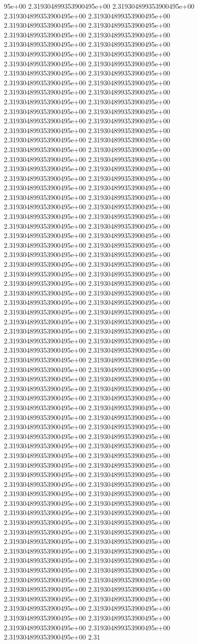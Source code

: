 95e+00	2.319304899353900495e+00	2.319304899353900495e+00	2.319304899353900495e+00	2.319304899353900495e+00	2.319304899353900495e+00	2.319304899353900495e+00	2.319304899353900495e+00	2.319304899353900495e+00	2.319304899353900495e+00	2.319304899353900495e+00	2.319304899353900495e+00	2.319304899353900495e+00	2.319304899353900495e+00	2.319304899353900495e+00	2.319304899353900495e+00	2.319304899353900495e+00	2.319304899353900495e+00	2.319304899353900495e+00	2.319304899353900495e+00	2.319304899353900495e+00	2.319304899353900495e+00	2.319304899353900495e+00	2.319304899353900495e+00	2.319304899353900495e+00	2.319304899353900495e+00	2.319304899353900495e+00	2.319304899353900495e+00	2.319304899353900495e+00	2.319304899353900495e+00	2.319304899353900495e+00	2.319304899353900495e+00	2.319304899353900495e+00	2.319304899353900495e+00	2.319304899353900495e+00	2.319304899353900495e+00	2.319304899353900495e+00	2.319304899353900495e+00	2.319304899353900495e+00	2.319304899353900495e+00	2.319304899353900495e+00	2.319304899353900495e+00	2.319304899353900495e+00	2.319304899353900495e+00	2.319304899353900495e+00	2.319304899353900495e+00	2.319304899353900495e+00	2.319304899353900495e+00	2.319304899353900495e+00	2.319304899353900495e+00	2.319304899353900495e+00	2.319304899353900495e+00	2.319304899353900495e+00	2.319304899353900495e+00	2.319304899353900495e+00	2.319304899353900495e+00	2.319304899353900495e+00	2.319304899353900495e+00	2.319304899353900495e+00	2.319304899353900495e+00	2.319304899353900495e+00	2.319304899353900495e+00	2.319304899353900495e+00	2.319304899353900495e+00	2.319304899353900495e+00	2.319304899353900495e+00	2.319304899353900495e+00	2.319304899353900495e+00	2.319304899353900495e+00	2.319304899353900495e+00	2.319304899353900495e+00	2.319304899353900495e+00	2.319304899353900495e+00	2.319304899353900495e+00	2.319304899353900495e+00	2.319304899353900495e+00	2.319304899353900495e+00	2.319304899353900495e+00	2.319304899353900495e+00	2.319304899353900495e+00	2.319304899353900495e+00	2.319304899353900495e+00	2.319304899353900495e+00	2.319304899353900495e+00	2.319304899353900495e+00	2.319304899353900495e+00	2.319304899353900495e+00	2.319304899353900495e+00	2.319304899353900495e+00	2.319304899353900495e+00	2.319304899353900495e+00	2.319304899353900495e+00	2.319304899353900495e+00	2.319304899353900495e+00	2.319304899353900495e+00	2.319304899353900495e+00	2.319304899353900495e+00	2.319304899353900495e+00	2.319304899353900495e+00	2.319304899353900495e+00	2.319304899353900495e+00	2.319304899353900495e+00	2.319304899353900495e+00	2.319304899353900495e+00	2.319304899353900495e+00	2.319304899353900495e+00	2.319304899353900495e+00	2.319304899353900495e+00	2.319304899353900495e+00	2.319304899353900495e+00	2.319304899353900495e+00	2.319304899353900495e+00	2.319304899353900495e+00	2.319304899353900495e+00	2.319304899353900495e+00	2.319304899353900495e+00	2.319304899353900495e+00	2.319304899353900495e+00	2.319304899353900495e+00	2.319304899353900495e+00	2.319304899353900495e+00	2.319304899353900495e+00	2.319304899353900495e+00	2.319304899353900495e+00	2.319304899353900495e+00	2.319304899353900495e+00	2.319304899353900495e+00	2.319304899353900495e+00	2.319304899353900495e+00	2.319304899353900495e+00	2.319304899353900495e+00	2.319304899353900495e+00	2.319304899353900495e+00	2.319304899353900495e+00	2.31